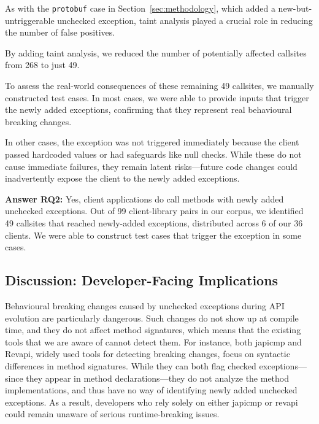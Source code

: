 As with the \texttt{protobuf} case in Section~\ref{sec:methodology}, which added a new-but-untriggerable unchecked exception, taint analysis played a crucial role in reducing the number of false positives.

\vspace{1em}
\begin{tcolorbox}[colback=gray!10, colframe=black]
By adding taint analysis, we reduced the number of potentially affected callsites from 268 to just 49.
\end{tcolorbox}
\vspace{1em}

To assess the real-world consequences of these remaining 49 callsites, we manually constructed test cases. In most cases, we were able to provide inputs that trigger the newly added exceptions, confirming that they represent real behavioural breaking changes.

In other cases, the exception was not triggered immediately because the client passed hardcoded values or had safeguards like null checks. While these do not cause immediate failures, they remain latent risks—future code changes could inadvertently expose the client to the newly added exceptions.

\vspace{1em}
\begin{tcolorbox}[colback=gray!10, colframe=black]
\textbf{Answer RQ2:} Yes, client applications do call methods with newly added unchecked exceptions. Out of 99 client-library pairs in our corpus, we identified 49 callsites that reached newly-added exceptions, distributed across 6 of our 36 clients. We were able to construct test cases that trigger the exception in some cases.
\end{tcolorbox}
\vspace{1em}

\subsection{Discussion: Developer-Facing Implications}

Behavioural breaking changes caused by unchecked exceptions during API evolution are particularly dangerous. Such changes do not show up at compile time, and they do not affect method signatures, which means that the existing tools that we are aware of cannot detect them. For instance, both japicmp and Revapi, widely used tools for detecting breaking changes, focus on syntactic differences in method signatures. While they can both flag checked exceptions—since they appear in method declarations—they do not analyze the method implementations, and thus have no way of identifying newly added unchecked exceptions. As a result, developers who rely solely on either japicmp or revapi could remain unaware of serious runtime-breaking issues.

